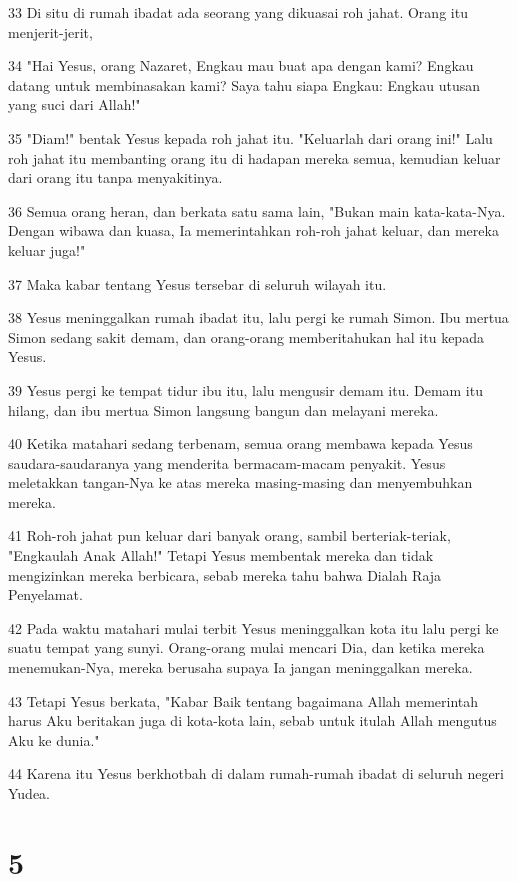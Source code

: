 \par 33 Di situ di rumah ibadat ada seorang yang dikuasai roh jahat. Orang itu menjerit-jerit,
\par 34 "Hai Yesus, orang Nazaret, Engkau mau buat apa dengan kami? Engkau datang untuk membinasakan kami? Saya tahu siapa Engkau: Engkau utusan yang suci dari Allah!"
\par 35 "Diam!" bentak Yesus kepada roh jahat itu. "Keluarlah dari orang ini!" Lalu roh jahat itu membanting orang itu di hadapan mereka semua, kemudian keluar dari orang itu tanpa menyakitinya.
\par 36 Semua orang heran, dan berkata satu sama lain, "Bukan main kata-kata-Nya. Dengan wibawa dan kuasa, Ia memerintahkan roh-roh jahat keluar, dan mereka keluar juga!"
\par 37 Maka kabar tentang Yesus tersebar di seluruh wilayah itu.
\par 38 Yesus meninggalkan rumah ibadat itu, lalu pergi ke rumah Simon. Ibu mertua Simon sedang sakit demam, dan orang-orang memberitahukan hal itu kepada Yesus.
\par 39 Yesus pergi ke tempat tidur ibu itu, lalu mengusir demam itu. Demam itu hilang, dan ibu mertua Simon langsung bangun dan melayani mereka.
\par 40 Ketika matahari sedang terbenam, semua orang membawa kepada Yesus saudara-saudaranya yang menderita bermacam-macam penyakit. Yesus meletakkan tangan-Nya ke atas mereka masing-masing dan menyembuhkan mereka.
\par 41 Roh-roh jahat pun keluar dari banyak orang, sambil berteriak-teriak, "Engkaulah Anak Allah!" Tetapi Yesus membentak mereka dan tidak mengizinkan mereka berbicara, sebab mereka tahu bahwa Dialah Raja Penyelamat.
\par 42 Pada waktu matahari mulai terbit Yesus meninggalkan kota itu lalu pergi ke suatu tempat yang sunyi. Orang-orang mulai mencari Dia, dan ketika mereka menemukan-Nya, mereka berusaha supaya Ia jangan meninggalkan mereka.
\par 43 Tetapi Yesus berkata, "Kabar Baik tentang bagaimana Allah memerintah harus Aku beritakan juga di kota-kota lain, sebab untuk itulah Allah mengutus Aku ke dunia."
\par 44 Karena itu Yesus berkhotbah di dalam rumah-rumah ibadat di seluruh negeri Yudea.

\chapter{5}

